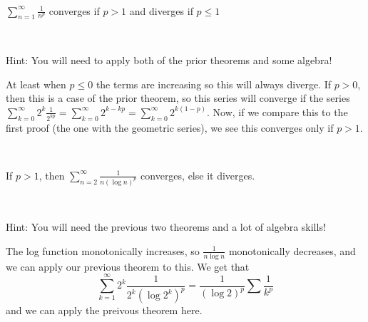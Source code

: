\documentclass{article}
\begin{document}
\begin{theorem}
\

$\sum_{n=1}^\infty \frac{1}{n^p}$ converges if $p > 1$ and diverges if $p \leq 1$
\end{theorem}

\begin{customproof}
\

Hint: You will need to apply both of the prior theorems and some algebra!

At least when $p \leq 0$ the terms are increasing so this will always diverge. If $p > 0$, then this is a case of the prior theorem, so this series will converge if the series $\sum_{k=0}^\infty 2^{k} \frac{1}{2^{kp}} = \sum_{k=0}^\infty 2^{k-kp} =  \sum_{k=0}^\infty 2^{k(1-p)}$. Now, if we compare this to the first proof (the one with the geometric series), we see this converges only if $p > 1$.
\end{customproof}


\begin{theorem}
\

If $p>1$, then $\sum_{n=2}^\infty \frac{1}{n (\log n)^p}$ converges, else it diverges.
\end{theorem}

\begin{customproof}
\

Hint: You will need the previous two theorems and a lot of algebra skills!

The log function monotonically increases, so $\frac{1}{n \log n}$ monotonically decreases, and we can apply our previous theorem to this. We get that $$\sum_{k=1}^\infty 2^k \frac{1}{2^k (\log 2^k)^p} = \frac{1}{(\log 2)^p} \sum \frac{1}{k^p}$$and we can apply the preivous theorem here.
\end{customproof}
\end{document}
